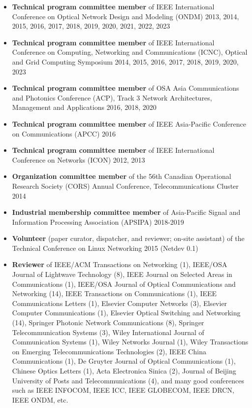 \documentclass[letterpaper,11pt]{article}
\begin{document}
\begin{CJK}{UTF8}{gbsn}
\begin{itemize}
\item
\textbf{Technical program committee member} of IEEE International Conference on Optical Network Design and Modeling (ONDM)
2013, 2014, 2015, 2016, 2017, 2018, 2019, 2020, 2021, 2022, 2023

\item
\textbf{Technical program committee member} of IEEE International Conference on Computing, Networking and Communications (ICNC),
Optical and Grid Computing Symposium 2014, 2015, 2016, 2017, 2018, 2019, 2020, 2023

\item
\textbf{Technical program committee member} of OSA Asia Communications and Photonics Conference (ACP),
Track 3 Network Architectures, Management and Applications 2016, 2018, 2020

\item
\textbf{Technical program committee member} of IEEE Asia-Pacific Conference on Communications (APCC) 2016

\item
\textbf{Technical program committee member} of IEEE International Conference on Networks (ICON) 2012, 2013

\item
\textbf{Organization committee member} of the 56th Canadian Operational Research Society (CORS) Annual Conference, Telecommunications Cluster 2014

\item
\textbf{Industrial membership committee member} of Asia-Pacific Signal and Information Processing Association (APSIPA) 2018-2019

\item
\textbf{Volunteer} (paper curator, dispatcher, and reviewer; on-site assistant) of the Technical Conference on Linux Networking 2015 (Netdev 0.1)

\item
\textbf{Reviewer} of IEEE/ACM Transactions on Networking (1), IEEE/OSA Journal of Lightwave Technology (8),
IEEE Journal on Selected Areas in Communications (1),
IEEE/OSA Journal of Optical Communications and Networking (14), IEEE Transactions on Communications (1), IEEE Communications Letters (1),
Elsevier Computer Networks (3), Elsevier Computer Communications (1), Elsevier Optical Switching and Networking (14),
Springer Photonic Network Communications (8), Springer Telecommunication Systems (3), Wiley International Journal of Communication Systems (1),
Wiley Networks Journal (1), Wiley Transactions on Emerging Telecommunications Technologies (2), IEEE China Communications (1),
De Gruyter Journal of Optical Communications (1), Chinese Optics Letters (1),
Acta Electronica Sinica (2), Journal of Beijing University of Posts and Telecommunications (4),
and many good conferences such as IEEE INFOCOM, IEEE ICC, IEEE GLOBECOM, IEEE DRCN, IEEE ONDM, etc.


\end{itemize}
\end{CJK}
\end{document}
